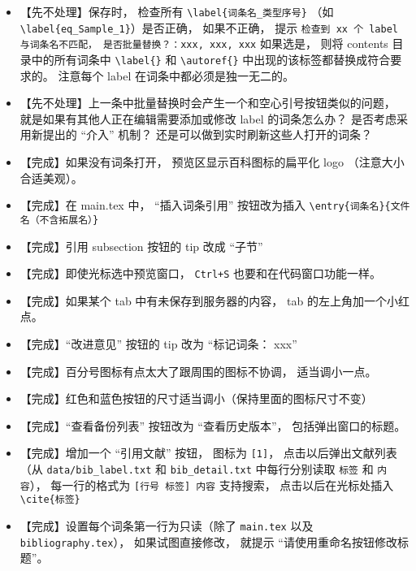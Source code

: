 \begin{itemize}
\item 【先不处理】保存时， 检查所有 \verb|\label{词条名_类型序号}| （如 \verb|\label{eq_Sample_1}|）是否正确， 如果不正确， 提示 \verb|检查到 xx 个 label 与词条名不匹配， 是否批量替换？：xxx, xxx, xxx| 如果选是， 则将 contents 目录中的所有词条中 \verb|\label{}| 和 \verb|\autoref{}| 中出现的该标签都替换成符合要求的。 注意每个 label 在词条中都必须是独一无二的。

\item 【先不处理】上一条中批量替换时会产生一个和空心引号按钮类似的问题， 就是如果有其他人正在编辑需要添加或修改 label 的词条怎么办？ 是否考虑采用新提出的 “介入” 机制？ 还是可以做到实时刷新这些人打开的词条？

\item 【完成】如果没有词条打开， 预览区显示百科图标的扁平化 logo （注意大小合适美观）。

\item 【完成】在 main.tex 中， “插入词条引用” 按钮改为插入 \verb|\entry{词条名}{文件名（不含拓展名）}|

\item 【完成】引用 subsection 按钮的 tip 改成 “子节”

\item 【完成】即使光标选中预览窗口， \verb|Ctrl+S| 也要和在代码窗口功能一样。

\item 【完成】如果某个 tab 中有未保存到服务器的内容， tab 的左上角加一个小红点。

\item 【完成】“改进意见” 按钮的 tip 改为 “标记词条： xxx”

\item 【完成】百分号图标有点太大了跟周围的图标不协调， 适当调小一点。

\item 【完成】红色和蓝色按钮的尺寸适当调小（保持里面的图标尺寸不变）

\item 【完成】“查看备份列表” 按钮改为 “查看历史版本”， 包括弹出窗口的标题。

\item 【完成】增加一个 “引用文献” 按钮， 图标为 \verb|[1]|， 点击以后弹出文献列表（从 \verb|data/bib_label.txt| 和 \verb|bib_detail.txt| 中每行分别读取 \verb|标签| 和 \verb|内容|）， 每一行的格式为 \verb|[行号 标签] 内容| 支持搜索， 点击以后在光标处插入 \verb|\cite{标签}|

\item 【完成】设置每个词条第一行为只读（除了 \verb|main.tex| 以及 \verb|bibliography.tex|）， 如果试图直接修改， 就提示 “请使用重命名按钮修改标题”。


\end{itemize}
